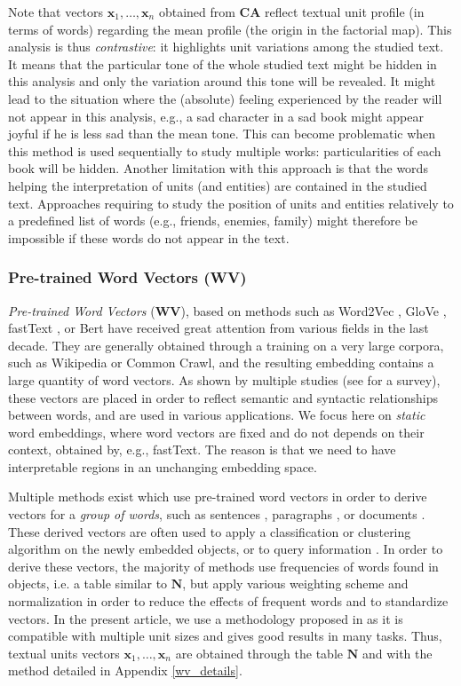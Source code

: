 \documentclass[
twocolumn,
]{ceurart}
\begin{document}
Note that vectors $\mathbf{x}_1, \ldots, \mathbf{x}_n$ obtained from \textbf{CA} reflect textual unit profile (in terms of words) regarding the mean profile (the origin in the factorial map). This analysis is thus \emph{contrastive}: it highlights unit variations among the studied text. It means that the particular tone of the whole studied text might be hidden in this analysis and only the variation around this tone will be revealed. It might lead to the situation where the (absolute) feeling experienced by the reader will not appear in this analysis, e.g., a sad character in a sad book might appear joyful if he is less sad than the mean tone. This can become problematic when this method is used sequentially to study multiple works: particularities of each book will be hidden. Another limitation with this approach is that the words helping the interpretation of units (and entities) are contained in the studied text. Approaches requiring to study the position of units and entities relatively to a predefined list of words (e.g., friends, enemies, family) might therefore be impossible if these words do not appear in the text.

\subsubsection{Pre-trained Word Vectors (WV)}
\label{wv_method}

\emph{Pre-trained Word Vectors}$  $ (\textbf{WV}), based on methods such as Word2Vec \cite{Mikolov2013}, GloVe \cite{Pennington2014}, fastText \cite{Bojanowski2017}, or Bert \cite{Devlin2018} have received great attention from various fields in the last decade. They are generally obtained through a training on a very large corpora, such as Wikipedia or Common Crawl, and the resulting embedding contains a large quantity of word vectors. As shown by multiple studies (see \cite{Li2017} for a survey), these vectors are placed in order to reflect semantic and syntactic relationships between words, and are used in various applications. We focus here on \emph{static} word embeddings, where word vectors are fixed and do not depends on their context, obtained by, e.g., fastText. The reason is that we need to have interpretable regions in an unchanging embedding space.

Multiple methods exist which use pre-trained word vectors in order to derive vectors for a \emph{group of words}, such as sentences \cite{Grener2017, Arora2017}, paragraphs \cite{Le2014}, or documents \cite{Kusner2015}. These derived vectors are often used to apply a classification or clustering algorithm on the newly embedded objects, or to query information \cite{Kusner2015, Arora2017}. In order to derive these vectors, the majority of methods use frequencies of words found in objects, i.e. a table similar to $\mathbf{N}$, but apply various weighting scheme and normalization in order to reduce the effects of frequent words and to standardize vectors. In the present article, we use a methodology proposed in \cite{Arora2017} as it is compatible with multiple unit sizes and gives good results in many tasks. Thus, textual units vectors $\mathbf{x}_1, \ldots, \mathbf{x}_n$ are obtained through the table $\mathbf{N}$ and with the method detailed in Appendix \ref{wv_details}. 
\end{document}
